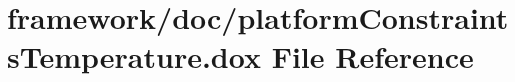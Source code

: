 \hypertarget{platform_constraints_temperature_8dox}{}\section{framework/doc/platform\+Constraints\+Temperature.dox File Reference}
\label{platform_constraints_temperature_8dox}
